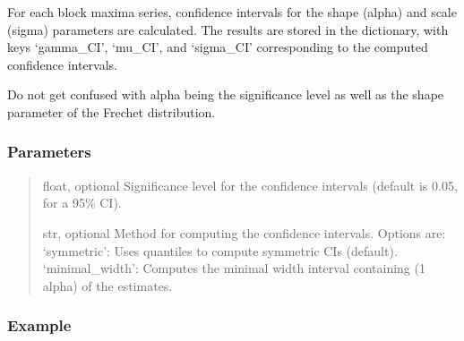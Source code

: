 \documentclass[a4paper,11pt,openany,english]{sphinxmanual}
\begin{document}
\begin{fulllineitems}
\begin{fulllineitems}
\begin{itemize}
\end{itemize}

\sphinxAtStartPar
For each block maxima series, confidence intervals for the shape (alpha) and scale (sigma) parameters are calculated. The results 
are stored in the  dictionary, with keys ‘gamma\_CI’, ‘mu\_CI’, and ‘sigma\_CI’ corresponding to the computed confidence intervals.

\sphinxAtStartPar
Do not get confused with alpha being the significance level as well as the shape parameter of the Frechet distribution.


\subsubsection{Parameters}
\label{\detokenize{api_topt:id69}}\begin{quote}\begin{description}
\sphinxAtStartPar
float, optional
Significance level for the confidence intervals (default is 0.05, for a 95\% CI).

\sphinxAtStartPar
str, optional
Method for computing the confidence intervals. Options are:
\sphinxhyphen{} ‘symmetric’: Uses quantiles to compute symmetric CIs (default).
\sphinxhyphen{} ‘minimal\_width’: Computes the minimal width interval containing (1 \sphinxhyphen{} alpha) of the estimates.

\end{description}\end{quote}


\subsubsection{Example}
\label{\detokenize{api_topt:id70}}
\begin{sphinxVerbatim}[commandchars=\\\{\}]
  
 
\end{sphinxVerbatim}



\end{fulllineitems}
\end{fulllineitems}
\end{document}
